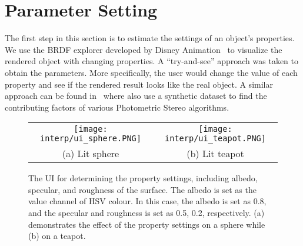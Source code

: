 


\section{Parameter Setting}
The first step in this section is to estimate the settings of an object's properties. We use the BRDF explorer developed by Disney Animation~\cite{disnybrdf} to visualize the rendered object with changing properties. A ``try-and-see'' approach was taken to obtain the parameters. More specifically, the user would change the value of each property and see if the rendered result looks like the real object. A similar approach can be found in~\cite{Berkiten:2016:ARB} where \citeauthor{Berkiten:2016:ARB} also use a synthetic dataset to find the contributing factors of various Photometric Stereo algorithms.
\begin{figure}[!htbp]
\centering
\begin{tabular}{cc}
  \texttt{[image: interp/ui\_sphere.PNG]}&
  \texttt{[image: interp/ui\_teapot.PNG]}\\
  (a) Lit sphere & (b) Lit teapot\\
\end{tabular}
\caption{The UI for determining the property settings, including albedo, specular, and roughness of the surface. The albedo is set as the value channel of HSV colour. In this case, the albedo is set as 0.8, and the specular and roughness is set as 0.5, 0.2, respectively. (a) demonstrates the effect of the property settings on a sphere while (b) on a teapot.}
\label{fig:ui}
\end{figure}

